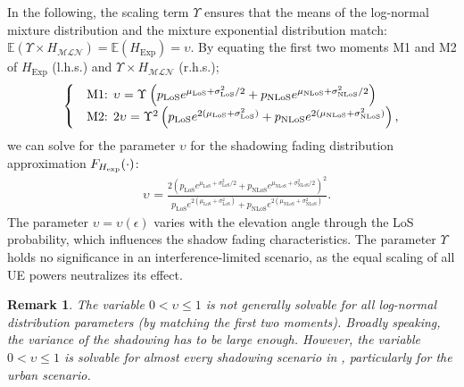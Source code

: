 \documentclass[lettersize,journal]{IEEEtran}
\newtheorem*{remark}{Remark}
\begin{document}
In the following, the scaling term $\Upsilon$ ensures that the means of the log-normal mixture distribution and the mixture exponential distribution match: $\mathbb{E}(\Upsilon \times H_{\mathcal{MLN}}) = \mathbb{E}(H_{\text{Exp}}) = \upsilon$. By equating the first two moments M1 and M2 of $H_{\text{Exp}}$ (l.h.s.) and $\Upsilon_{}\times H_{\mathcal{M} \mathcal{L}\mathcal{N}}$ (r.h.s.);
\begin{equation}
  \label{eq:matchingmoments}
  \begin{cases}
    &\textup{M1: }\upsilon_{} = \Upsilon_{} \left(p_{\text{LoS}} e^{\mu_{\text{LoS}} + \sigma_{\text{LoS}}^2/2} + p_{\text{NLoS}} e^{\mu_{\text{NLoS}} + \sigma_{\text{NLoS}}^2/2}\right)\\
    &\textup{M2: }2\upsilon_{}= \Upsilon_{}^2 \left( p_{\text{LoS}} e^{2(\mu_{\text{LoS}} + \sigma_{\text{LoS}}^2)} + p_{\text{NLoS}} e^{2(\mu_{\text{NLoS}} + \sigma_{\text{NLoS}}^2)} \right), 
  \end{cases}
\end{equation}
 we can solve for the parameter $\upsilon$ for the shadowing fading distribution approximation $F_{H_{\textup{exp}}}(\cdot)$:
\begin{align}
  \label{eq:upsilon}
  & \upsilon_{}=\frac{ 2\left( p_{\text{LoS}}e^{\mu_{\text{LoS}}+\sigma^2_{\text{LoS}}/2}+p_{\text{NLoS}}e^{\mu_{\text{NLoS}}+\sigma^2_{\text{NLoS}}/2} \right)^2}{p_{\text{LoS}}e^{2(\mu_{\text{LoS}}+\sigma_{\text{LoS}}^2)}+p_{\text{NLoS}}e^{2(\mu_{\text{NLoS}}+\sigma_{\text{NLoS}}^2)}}.
\end{align}
The parameter $\upsilon=\upsilon(\epsilon)$ varies with the elevation angle through the LoS probability, which influences the shadow fading characteristics. The parameter $\Upsilon_{}$ holds no significance in an interference-limited scenario, as the equal scaling of all UE powers neutralizes its effect.




\begin{remark}
  The variable $0 < \upsilon \leq 1$ is not generally solvable for all log-normal distribution parameters (by matching the first two moments). Broadly speaking, the variance of the shadowing has to be large enough. However, the variable $0<\upsilon \leq 1$ is solvable for almost every shadowing scenario in \cite{TR38.811}, particularly for the urban scenario.
\end{remark}
\end{document}
